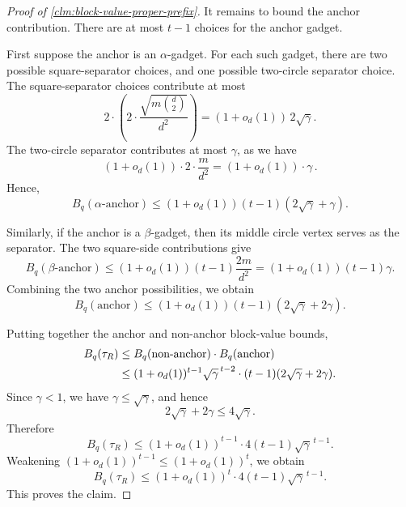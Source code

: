\documentclass[12pt]{article}
\begin{document}
\begin{proof}[Proof of \cref{clm:block-value-proper-prefix}]
It remains to bound the anchor contribution. There are at most \(t-1\) choices
for the anchor gadget.

First suppose the anchor is an \(\alpha\)-gadget. For each such gadget, there
are two possible square-separator choices, and one possible two-circle
separator choice. The square-separator choices contribute at most
\[
    2\cdot
    \left(
        2\cdot \frac{\sqrt{m\binom d2}}{d^2}
    \right)
    =
    (1+o_d(1))\,2\sqrt{\gamma}.
\]
The two-circle separator contributes at most \(\gamma\), as we have
\[
    (1+o_d(1)) \cdot 2 \cdot \frac{m}{d^2} = (1+o_d(1))  \cdot \gamma\,.
\]
 Hence,
\[
    B_q(\alpha\text{-anchor})
    \le
    (1+o_d(1))(t-1)(2\sqrt{\gamma}+\gamma).
\]

Similarly, if the anchor is a \(\beta\)-gadget, then its middle circle vertex
serves as the separator. The two square-side contributions give
\[
    B_q(\beta\text{-anchor})
    \le
    (1+o_d(1))(t-1)\frac{2m}{d^2}
    =
    (1+o_d(1))(t-1)\gamma.
\]
Combining the two anchor possibilities, we obtain 
\[
    B_q(\text{anchor})
    \le
    (1+o_d(1))(t-1)(2\sqrt{\gamma}+2\gamma).
\]

Putting together the anchor and non-anchor block-value bounds,
\[
\begin{aligned}
    B_q(\tau_R)
    &\le
    B_q(\text{non\mbox{-}anchor})\cdot B_q(\text{anchor}) \\
    &\le
    (1+o_d(1))^{t-1}
    \sqrt{\gamma}^{\,t-2}
    \cdot
    (t-1)(2\sqrt{\gamma}+2\gamma).
\end{aligned}
\]
Since \(\gamma<1\), we have \(\gamma\le \sqrt{\gamma}\), and hence
\[
    2\sqrt{\gamma}+2\gamma
    \le
    4\sqrt{\gamma}.
\]
Therefore
\[
    B_q(\tau_R)
    \le
    (1+o_d(1))^{t-1}\cdot 4(t-1)\sqrt{\gamma}^{\,t-1}.
\]
Weakening \((1+o_d(1))^{t-1}\le (1+o_d(1))^t\), we obtain
\[
    B_q(\tau_R)
    \le
    (1+o_d(1))^t\cdot 4(t-1)\sqrt{\gamma}^{\,t-1}.
\]
This proves the claim.
\end{proof}
\end{document}
